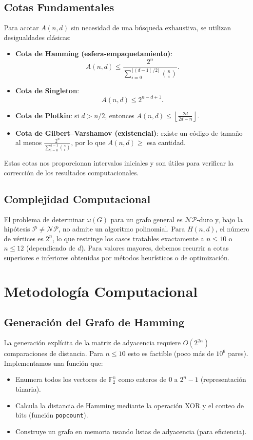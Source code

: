 \documentclass[12pt, spanish]{article}
\begin{document}
\subsection{Cotas Fundamentales}
Para acotar $A(n,d)$ sin necesidad de una búsqueda exhaustiva, se utilizan desigualdades clásicas:

\begin{itemize}
    \item \textbf{Cota de Hamming (esfera-empaquetamiento)}:  
    \[
    A(n,d) \le \frac{2^n}{\sum_{i=0}^{\lfloor (d-1)/2\rfloor} \binom{n}{i}}.
    \]
    \item \textbf{Cota de Singleton}:  
    \[
    A(n,d) \le 2^{n-d+1}.
    \]
    \item \textbf{Cota de Plotkin}: si $d > n/2$, entonces $A(n,d) \le \left\lfloor \frac{2d}{2d-n} \right\rfloor$.
    \item \textbf{Cota de Gilbert–Varshamov (existencial)}: existe un código de tamaño al menos $\frac{2^n}{\sum_{i=0}^{d-1} \binom{n}{i}}$, por lo que $A(n,d) \ge$ esa cantidad.
\end{itemize}
Estas cotas nos proporcionan intervalos iniciales y son útiles para verificar la corrección de los resultados computacionales.

\subsection{Complejidad Computacional}
El problema de determinar $\omega(G)$ para un grafo general es $\mathcal{NP}$-duro y, bajo la hipótesis $\mathcal{P}\neq\mathcal{NP}$, no admite un algoritmo polinomial. Para $H(n,d)$, el número de vértices es $2^n$, lo que restringe los casos tratables exactamente a $n \le 10$ o $n \le 12$ (dependiendo de $d$). Para valores mayores, debemos recurrir a cotas superiores e inferiores obtenidas por métodos heurísticos o de optimización.

\section{Metodología Computacional}
\label{sec:metodo}

\subsection{Generación del Grafo de Hamming}
La generación explícita de la matriz de adyacencia requiere $O(2^{2n})$ comparaciones de distancia. Para $n\le 10$ esto es factible (poco más de $10^6$ pares). Implementamos una función que:
\begin{itemize}
    \item Enumera todos los vectores de $\mathbb{F}_2^n$ como enteros de $0$ a $2^n-1$ (representación binaria).
    \item Calcula la distancia de Hamming mediante la operación XOR y el conteo de bits (función \texttt{popcount}).
    \item Construye un grafo en memoria usando listas de adyacencia (para eficiencia).
\end{itemize}
\end{document}

